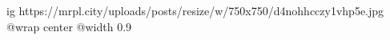 
 
 
 
 

\ifcmt
  ig https://mrpl.city/uploads/posts/resize/w/750x750/d4nohhcczy1vhp5e.jpg
  @wrap center
  @width 0.9
\fi
